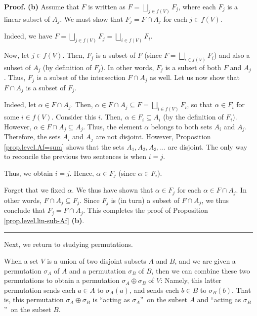\documentclass[numbers=enddot,12pt,final,onecolumn,notitlepage]{scrartcl}%
\numberwithin{exer}{section}
\theoremstyle{definition}
\newenvironment{proof}[1][Proof]{\noindent\textbf{#1.} }{\ \rule{0.5em}{0.5em}}
\let\sqcupnonlimits\bigsqcup
\renewcommand{\bigsqcup}{\sqcupnonlimits\limits}
\newenvironment{verlong}{}{}
\begin{document}
\begin{verlong}
\begin{proof}
\textbf{(b)} Assume that $F$ is written as $F=\bigsqcup_{j\in f\left(
V\right)  }F_{j}$, where each $F_{j}$ is a linear subset of $A_{j}$. We must
show that $F_{j}=F\cap A_{j}$ for each $j\in f\left(  V\right)  $.

Indeed, we have $F=\bigsqcup_{j\in f\left(  V\right)  }F_{j}=\bigsqcup_{i\in
f\left(  V\right)  }F_{i}$.

Now, let $j\in f\left(  V\right)  $. Then, $F_{j}$ is a subset of $F$ (since
$F=\bigsqcup_{i\in f\left(  V\right)  }F_{i}$) and also a subset of $A_{j}$
(by definition of $F_{j}$). In other words, $F_{j}$ is a subset of both $F$
and $A_{j}$. Thus, $F_{j}$ is a subset of the intersection $F\cap A_{j}$ as
well. Let us now show that $F\cap A_{j}$ is a subset of $F_{j}$.

Indeed, let $\alpha\in F\cap A_{j}$. Then, $\alpha\in F\cap A_{j}\subseteq
F=\bigsqcup_{i\in f\left(  V\right)  }F_{i}$, so that $\alpha\in F_{i}$ for
some $i\in f\left(  V\right)  $. Consider this $i$. Then, $\alpha\in
F_{i}\subseteq A_{i}$ (by the definition of $F_{i}$). However, $\alpha\in
F\cap A_{j}\subseteq A_{j}$. Thus, the element $\alpha$ belongs to both sets
$A_{i}$ and $A_{j}$. Therefore, the sets $A_{i}$ and $A_{j}$ are not disjoint.
However, Proposition \ref{prop.level.Af=sum} shows that the sets $A_{1}%
,A_{2},A_{3},\ldots$ are disjoint. The only way to reconcile the previous two
sentences is when $i=j$.

Thus, we obtain $i=j$. Hence, $\alpha\in F_{j}$ (since $\alpha\in F_{i}$).

Forget that we fixed $\alpha$. We thus have shown that $\alpha\in F_{j}$ for
each $\alpha\in F\cap A_{j}$. In other words, $F\cap A_{j}\subseteq F_{j}$.
Since $F_{j}$ is (in turn) a subset of $F\cap A_{j}$, we thus conclude that
$F_{j}=F\cap A_{j}$. This completes the proof of Proposition
\ref{prop.level.lin-sub-Af} \textbf{(b)}.
\end{proof}
\end{verlong}

Next, we return to studying permutations.

When a set $V$ is a union of two disjoint subsets $A$ and $B$, and we are
given a permutation $\sigma_{A}$ of $A$ and a permutation $\sigma_{B}$ of $B$,
then we can combine these two permutations to obtain a permutation $\sigma
_{A}\oplus\sigma_{B}$ of $V$: Namely, this latter permutation sends each $a\in
A$ to $\sigma_{A}\left(  a\right)  $, and sends each $b\in B$ to $\sigma
_{B}\left(  b\right)  $. That is, this permutation $\sigma_{A}\oplus\sigma
_{B}$ is \textquotedblleft acting as $\sigma_{A}$\textquotedblright\ on the
subset $A$ and \textquotedblleft acting as $\sigma_{B}$\textquotedblright\ on
the subset $B$.
\end{document}
